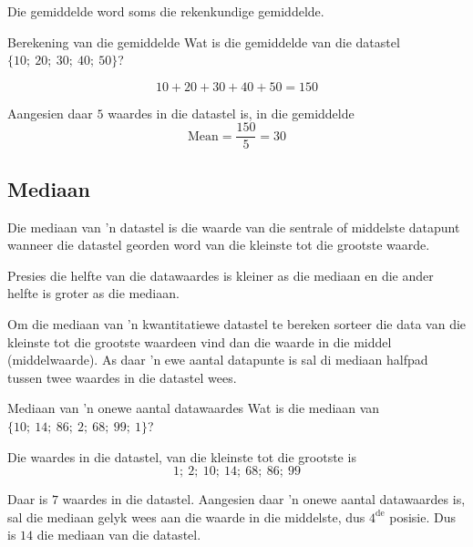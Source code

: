Die gemiddelde word soms die rekenkundige gemiddelde.
\par
{}

\begin{wex}{Berekening van die gemiddelde}
{Wat is die gemiddelde van die datastel $\{10;\ 20;\ 30;\ 40;\ 50\}$?}
{
  \begin{equation*}
    10 + 20 + 30 + 40 + 50 = 150
  \end{equation*}


  Aangesien daar $5$ waardes in die datastel is, in die gemiddelde
  \begin{equation*}
    \mbox{Mean} = \frac{150}{5} = 30
  \end{equation*}
}
\end{wex}

\subsection{Mediaan}
{Die mediaan van 'n datastel is die waarde van die sentrale of middelste datapunt wanneer die datastel georden word van die kleinste tot die grootste waarde.}

Presies die helfte van die datawaardes is kleiner as die mediaan en die ander helfte is groter as die mediaan.\par

Om die mediaan van 'n kwantitatiewe datastel te bereken sorteer die data van die kleinste tot die grootste waardeen vind dan die waarde in die middel (middelwaarde). As daar 'n ewe aantal datapunte is sal di mediaan halfpad tussen twee waardes in die datastel wees.

\begin{wex}{Mediaan van 'n onewe aantal datawaardes}
{Wat is die mediaan van $\{10;\ 14;\ 86;\ 2;\ 68;\ 99;\ 1\}$?}
{

  Die waardes in die datastel, van die kleinste tot die grootste is
  \begin{equation*}
    1;\ 2;\ 10;\ 14;\ 68;\ 86;\ 99
  \end{equation*}


  Daar is $7$ waardes in die datastel. Aangesien daar 'n onewe aantal datawaardes is, sal die mediaan gelyk wees aan die waarde in die middelste, dus $4^{\mathrm{de}}$ posisie. Dus is $14$ die mediaan van die datastel.
}
\end{wex}

